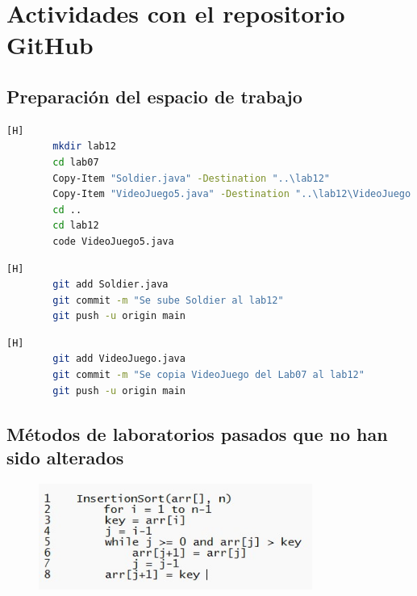 \documentclass{article}
\begin{document}
	\section{Actividades con el repositorio GitHub}
	
	\subsection{Preparación del espacio de trabajo}
	
	\begin{lstlisting}[language=bash,caption={Se crea la carpeta de laboratorio 12 y se copian los archivos del lab07 al lab12 }][H]
		mkdir lab12
		cd lab07
		Copy-Item "Soldier.java" -Destination "..\lab12"
		Copy-Item "VideoJuego5.java" -Destination "..\lab12\VideoJuego.java"
		cd ..
		cd lab12
		code VideoJuego5.java
	\end{lstlisting}
	
	\begin{lstlisting}[language=bash,caption={Commit: 1eaab04e81dc9e3fefb9e8c2eb3828b197354723 }][H]
		git add Soldier.java
		git commit -m "Se sube Soldier al lab12"
		git push -u origin main
	\end{lstlisting}
	
	\begin{lstlisting}[language=bash,caption={Commit: 3c1a953b3b0e88c13f5ed99d538f64928469608b }][H]
		git add VideoJuego.java
		git commit -m "Se copia VideoJuego del Lab07 al lab12"
		git push -u origin main
	\end{lstlisting}
	
		\subsection{Métodos de laboratorios pasados que no han sido alterados}
	
	
	\begin{figure}[H]
		\centering
		\includegraphics[width=0.8\textwidth,keepaspectratio]{img/insertion.jpg}
	\end{figure}
	
\end{document}

